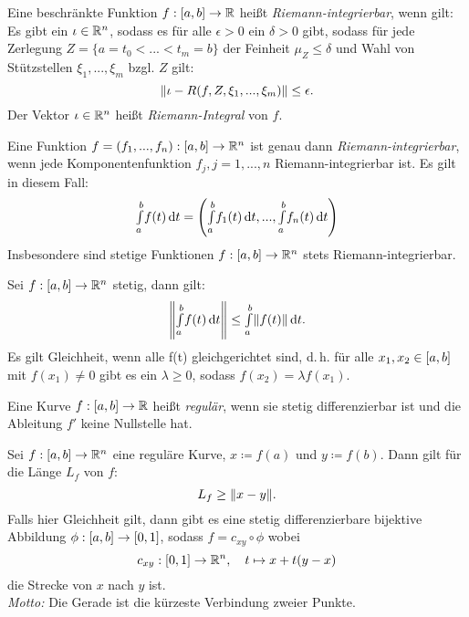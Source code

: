 \documentclass{cheat-sheet}
\begin{document}

\begin{defn} Eine beschränkte Funktion $f : \left[ a, b \right] \to \mathbb{R}$ heißt \emph{Riemann-integrierbar}, wenn gilt: Es gibt ein $\iota \in \mathbb{R}^n$, sodass es für alle $\epsilon > 0$ ein $\delta > 0$ gibt, sodass für jede Zerlegung $Z = \{ a = t_0 < ... < t_m = b \}$ der Feinheit $\mu_Z \le \delta$ und Wahl von Stützstellen $\xi_1, ..., \xi_m$ bzgl. $Z$ gilt:
\[ \lVert\iota - R(f, Z, \xi_1, ..., \xi_m)\rVert \le \epsilon. \]
Der Vektor $\iota \in \mathbb{R}^n$ heißt \emph{Riemann-Integral} von $f$.
\end{defn}

\begin{bem}
Eine Funktion $f = (f_1, ..., f_n) : \left[ a, b \right] \to \mathbb{R}^n$ ist genau dann \emph{Riemann-integrierbar}, wenn jede Komponentenfunktion $f_j, j = 1, ..., n$ Riemann-integrierbar ist. Es gilt in diesem Fall:
\[ {\textstyle \int\limits_{a}^{b}} f(t) \,\mathrm{d} t = \left( {\textstyle \int\limits_{a}^{b}} f_1(t) \,\mathrm{d} t, ..., {\textstyle \int\limits_{a}^{b}} f_n(t) \,\mathrm{d} t \right) \]
Insbesondere sind stetige Funktionen $f : \left[ a, b \right] \to \mathbb{R}^n$ stets Riemann-integrierbar.
\end{bem}

\begin{satz}
Sei $f : \left[ a, b \right] \to \mathbb{R}^n$ stetig, dann gilt:
\[ \left\| {\textstyle \int\limits_{a}^{b}} f(t) \,\mathrm{d} t \right\| \le {\textstyle \int\limits_{a}^{b}} \lVert f(t)\rVert \,\mathrm{d} t. \]
Es gilt Gleichheit, wenn alle f(t) gleichgerichtet sind, d.\,h. für alle $x_1, x_2 \in \left[ a, b \right]$ mit $f(x_1) \not= 0$ gibt es ein $\lambda \ge 0$, sodass $f(x_2) = \lambda f(x_1)$.
\end{satz}

\begin{defn}
Eine Kurve $f : \left[ a, b \right] \to \mathbb{R}$ heißt \emph{regulär}, wenn sie stetig differenzierbar ist und die Ableitung $f'$ keine Nullstelle hat.
\end{defn}

\begin{kor}
Sei $f : \left[ a, b \right] \to \mathbb{R}^n$ eine reguläre Kurve, $x \coloneqq f(a)$ und $y \coloneqq f(b)$. Dann gilt für die Länge $L_f$ von $f$:
\[ L_f \ge \lVert x - y\rVert. \]
Falls hier Gleichheit gilt, dann gibt es eine stetig differenzierbare bijektive Abbildung $\phi : \left[ a, b \right] \to \left[ 0, 1 \right]$, sodass $f = c_{xy} \circ \phi$ wobei
\[ c_{xy} : \left[ 0, 1 \right] \to \mathbb{R}^n,\quad t \mapsto x + t(y - x) \]
die Strecke von $x$ nach $y$ ist.\\
\textit{Motto:} Die Gerade ist die kürzeste Verbindung zweier Punkte.
\end{kor}
\end{document}
